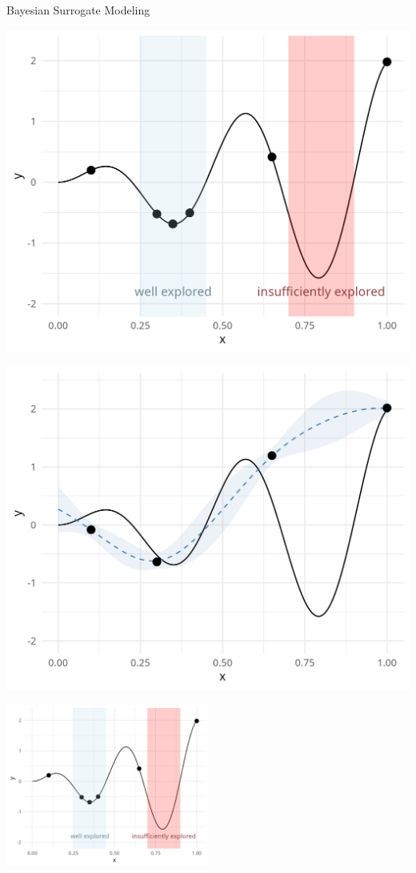 \documentclass[11pt,compress,t,notes=noshow, xcolor=table]{beamer}
\begin{document}
\begin{vbframe}{Bayesian Surrogate Modeling}
\framebreak


\begin{minipage}[b]{0.45\textwidth}
  \includegraphics[width = \textwidth]{figure_man/bayesian_loop_0.png}
\end{minipage}
\hfill
\begin{minipage}[b]{0.45\textwidth}
  \includegraphics[width = \textwidth]{figure_man/noisy_2.png}
\end{minipage}


\begin{center}
  \includegraphics[width = 0.5\textwidth]{figure_man/bayesian_loop_0.png}
\end{center}


\end{vbframe} 
\end{document}

